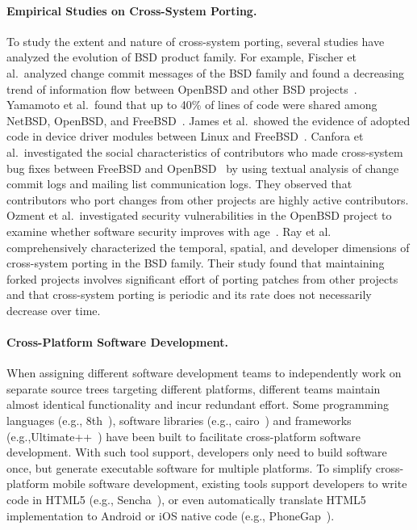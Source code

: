 \paragraph{{Empirical Studies on Cross-System Porting.}}
To study the extent and nature of cross-system porting, several studies have analyzed the evolution of BSD product family. For example, Fischer et al.~analyzed change commit messages of the BSD family and found a decreasing trend of information flow between OpenBSD and other BSD projects~\cite{Fischer2005}. Yamamoto et al.~found that up to 40\% of lines of code were shared among NetBSD, OpenBSD, and FreeBSD~\cite{Yamamoto2005}. James et al.~showed the evidence of adopted code in device driver modules between Linux and FreeBSD~\cite{Cordy2011:largecloning}. Canfora et al.~investigated the social characteristics of contributors who made cross-system bug fixes between FreeBSD and OpenBSD~\cite{Canfora2011:bsdfork} by using textual analysis of change commit logs and mailing list communication logs. They observed that contributors who port changes from other projects are highly active contributors. Ozment et al.~investigated security vulnerabilities in the OpenBSD project to examine whether software security improves with age~\cite{Ozment2006}. Ray et al.~\cite{Ray2012:FSE} comprehensively characterized the temporal, spatial, and developer dimensions of cross-system porting in the BSD family. Their study found that maintaining forked projects involves significant effort of porting patches from other projects and that cross-system porting  is periodic and its rate does not necessarily decrease over time. %

\paragraph{{Cross-Platform Software Development.}}
When assigning different software development teams to independently work on separate source trees targeting different platforms, different teams maintain almost identical functionality and incur redundant effort. Some programming languages (e.g., 8th~\cite{8th}), software libraries (e.g., cairo~\cite{cairo}) and frameworks (e.g.,Ultimate++~\cite{ultimate}) have been built to facilitate cross-platform software development. With such tool support, developers only need to build software once, but generate executable software for multiple platforms. %
To simplify cross-platform mobile software development, existing tools support developers to write code in HTML5 (e.g., Sencha~\cite{sencha}), or even automatically translate HTML5 implementation to Android or iOS native code (e.g., PhoneGap~\cite{phonegap}).

